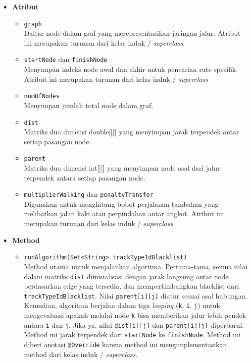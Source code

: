 \begin{itemize}
    \item \textbf{Atribut}
    \begin{itemize}
        \item \texttt{graph}
        \\ Daftar node dalam graf yang merepresentasikan jaringan jalur. Atribut ini merupakan turunan dari kelas induk / \textit{superclass}.
        \item \texttt{startNode} dan \texttt{finishNode}
        \\ Menyimpan indeks node awal dan akhir untuk pencarian rute spesifik. Atribut ini merupakan turunan dari kelas induk / \textit{superclass}
        \item \texttt{numOfNodes}
        \\ Menyimpan jumlah total node dalam graf.
        \item \texttt{dist}
        \\ Matriks dua dimensi double[][] yang menyimpan jarak terpendek antar setiap pasangan node.
        \item \texttt{parent}
        \\ Matriks dua dimensi int[][] yang menyimpan node asal dari jalur terpendek antara setiap pasangan node.
        \item \texttt{multiplierWalking} dan \texttt{penaltyTransfer}
        \\ Digunakan untuk menghitung bobot perjalanan tambahan yang melibatkan jalan kaki atau perpindahan antar angkot.  Atribut ini merupakan turunan dari kelas induk / \textit{superclass}
    \end{itemize}

    \item \textbf{Method}
    \begin{itemize}
        \item \texttt{runAlgorithm(Set<String> trackTypeIdBlacklist)}
        \\ Method utama untuk menjalankan algoritma. Pertama-tama, semua nilai dalam matriks \texttt{dist} diinisialisasi dengan jarak langsung antar node berdasarkan edge yang tersedia, dan mempertimbangkan blacklist dari \texttt{trackTypeIdBlacklist}. Nilai \texttt{parent[i][j]} diatur sesuai asal hubungan. Kemudian, algoritma berjalan dalam tiga \textit{looping} (\texttt{k}, \texttt{i}, \texttt{j}) untuk mengevaluasi apakah melalui node \texttt{k} bisa memberikan jalur lebih pendek antara \texttt{i} dan \texttt{j}. Jika ya, nilai \texttt{dist[i][j]} dan \texttt{parent[i][j]} diperbarui. Method ini jarak terpendek dari \texttt{startNode} ke \texttt{finishNode}. Method ini diberi anotasi \texttt{@Override} karena method ini mengimplementasikan method dari kelas induk / \textit{superclass}.


\end{itemize}
\end{itemize}
